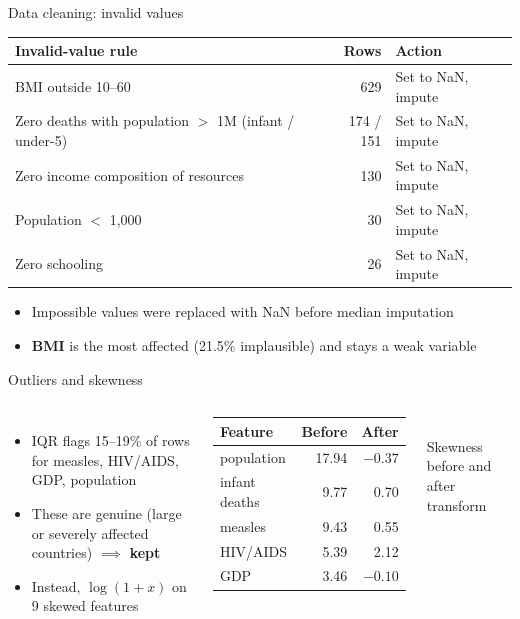 \begin{frame}{Data cleaning: invalid values}
  \centering\small
  \renewcommand{\arraystretch}{1.35}
  \begin{tabularx}{0.92\textwidth}{Xrl}\toprule
    \textbf{Invalid-value rule} & \textbf{Rows} & \textbf{Action}\\\midrule
    BMI outside 10--60 & 629 & Set to NaN, impute\\
    Zero deaths with population $>$ 1M (infant / under-5) & 174 / 151 & Set to NaN, impute\\
    Zero income composition of resources & 130 & Set to NaN, impute\\
    Population $<$ 1,000 & 30 & Set to NaN, impute\\
    Zero schooling & 26 & Set to NaN, impute\\\bottomrule
  \end{tabularx}
  \vspace{0.35cm}
  \begin{itemize}\small
    \item Impossible values were replaced with NaN before median imputation
    \item \textbf{BMI} is the most affected (21.5\% implausible) and stays a weak variable
  \end{itemize}
\end{frame}

\begin{frame}{Outliers and skewness}
  \begin{columns}[T]
    \begin{itemize}
      \item IQR flags 15--19\% of rows for measles, HIV/AIDS, GDP, population
      \item These are genuine (large or severely affected countries) $\implies$ \textbf{kept}
      \item Instead, \textbf{$\log(1+x)$} on 9 skewed features
    \end{itemize}
    \centering\small
    \begin{tabular}{lrr}\toprule
      \textbf{Feature} & \textbf{Before} & \textbf{After}\\\midrule
      population & 17.94 & $-0.37$\\
      infant deaths & 9.77 & 0.70\\
      measles & 9.43 & 0.55\\
      HIV/AIDS & 5.39 & 2.12\\
      GDP & 3.46 & $-0.10$\\\bottomrule
    \end{tabular}\\[2pt]{\footnotesize Skewness before and after transform}
  \end{columns}
\end{frame}

